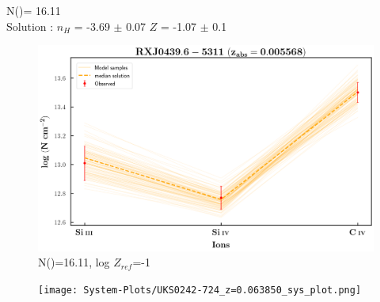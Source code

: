 \documentclass[12pt,draft]{report}
\newcommand\ion[2]{\text{#1\,\textsc{\lowercase{#2}}}}
\begin{document}
N(\ion{H}{I})= 16.11  \\ 

Solution : $n_H$ = -3.69 $\pm$ 0.07 \hspace{10mm} $Z$ = -1.07 $\pm$ 0.1 \newline


\begin{figure}[!htbp]
    \centering
    \includegraphics[width=1\linewidth]{Ionisation-Modelling-Plots/rxj0439-z=0.005568-compII_logZ=-1.png}
    \caption{N(\ion{H}{i})=16.11, log $Z_{ref}$=-1}
\end{figure}



\newpage

\begin{landscape}

\begin{figure}
    \centering
    \vspace{-20mm}
    \hspace*{-35mm}
    \texttt{[image: System-Plots/UKS0242-724\_z=0.063850\_sys\_plot.png]}
\end{figure}

\end{landscape}
\end{document}
